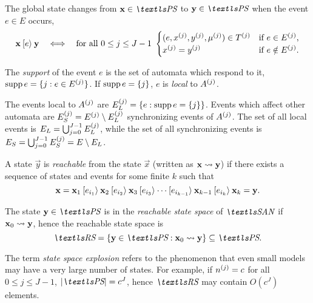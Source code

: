 \needspace{10ex}

The global state changes from $\vec{x} \in \PS$ to $\vec{y} \in \PS$
when the event $e \in E$ occurs,
\begin{equation}
  \label{eq:bakcground:san:transition}
  \bm{\mathrm{x}} \mathbin{[e\rangle} \bm{\mathrm{y}} \quad\Longleftrightarrow\quad
  \text{for all $0 \le j \le J - 1$ } \begin{cases}
    (e, x^{(j)}, y^{(j)}, \mu^{(j)}) \in T^{(j)}
    & \text{if $e \in E^{(j)}$,} \\
    x^{(j)} = y^{(j)} & \text{if $e \notin E^{(j)}$.}
  \end{cases}
\end{equation}

The \emph{support} of the event $e$ is the set of automata which
respond to it, $\operatorname{supp} e = \{ j : e \in E^{(j)} \}$. If $\operatorname{supp} e =
\{ j \}$, $e$ is \emph{local} to $A^{(j)}$.

The events local to $A^{(j)}$ are
$E_L^{(j)} = \{ e : \operatorname{supp} e = \{ j \}\}$. Events which affect other
automata are $E_S^{(j)} = E^{(j)} \setminus E_L^{(j)}$
synchronizing events of $A^{(j)}$. The set of all local events
is $E_L = \bigcup_{j = 0}^{J - 1} E_L^{(j)}$, while the set of all
synchronizing events is $E_S = \bigcup_{j = 0}^{J - 1} E_S^{(j)} =
E \setminus E_L$.

A state $\vec{y}$ is \emph{reachable} from the state $\vec{x}$
(written as $\bm{\mathrm{x}} \leadsto \bm{\mathrm{y}}$) if there exists a sequence of
states and events for some finite $k$ such that
\begin{equation}
  \bm{\mathrm{x}} = \bm{\mathrm{x}}_1 \mathbin{[e_{i_1}\rangle} \bm{\mathrm{x}}_2 \mathbin{[e_{i_2}\rangle}
  \bm{\mathrm{x}}_3 \mathbin{[e_{i_3}\rangle} \cdots \mathbin{[e_{i_{k - 1}}\rangle} \bm{\mathrm{x}}_{k
    - 1} \mathbin{[e_{i_k}\rangle} \bm{\mathrm{x}}_k = \bm{\mathrm{y}} \text.
\end{equation}

The state $\vec{y} \in \PS$ is in the \emph{reachable state space} of
$\SAN$ if $\bm{\mathrm{x}}_0 \leadsto \bm{\mathrm{y}}$, hence the reachable state
space is
\begin{equation}
  \RS = \{ \vec{y} \in \PS : \vec{x}_0 \reachto \vec{y} \} \subseteq
  \PS \text.
\end{equation}

The term \emph{state space explosion} refers to the phenomenon that
even small models may have a very large number of states. For example,
if $n^{(j)} = c$ for all $0 \le j \le J - 1$, $\lvert \PS \rvert =
c^J$, hence $\RS$ may contain $O(c^J)$ elements.


